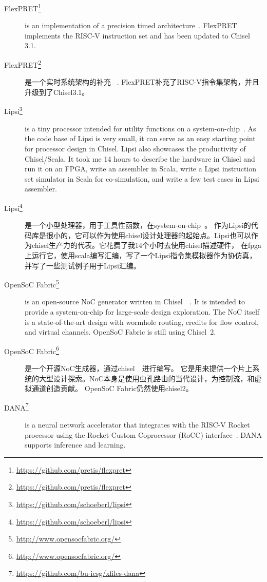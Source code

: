\documentclass[%
    10pt,
    headinclude, footexclude,
    openright, %
    notitlepage,
    cleardoubleempty,
    headsepline,
    pointlessnumbers,
    bibtotoc, idxtotoc,
    ]{scrbook}
\newcommand{\myref}[2]{\href{#1}{#2}}
\renewcommand{\myref}[2]{{#2}{\footnote{\url{#1}}}}
\begin{document}
{{\begin{description}
\item[\myref{https://github.com/pretis/flexpret}{FlexPRET}] is an implementation of a
precision timed architecture~\cite{Zimmer:EECS-2015-181}. FlexPRET implements
the RISC-V instruction set and has been updated to Chisel 3.1.

\item[\myref{https://github.com/pretis/flexpret}{FlexPRET}] 是一个实时系统架构的补充
~\cite{Zimmer:EECS-2015-181}. FlexPRET补充了RISC-V指令集架构，并且升级到了Chisel3.1。

\item[\myref{https://github.com/schoeberl/lipsi}{Lipsi}] is a tiny processor intended
for utility functions on a system-on-chip~\cite{lipsi:arcs2018}. As the code base of
Lipsi is very small, it can serve as an easy starting point for processor design in Chisel.
Lipsi also showcases the productivity of Chisel/Scala. It took me 14 hours to describe the
hardware in Chisel and run it on an FPGA, write an assembler in Scala, write a
Lipsi instruction set simulator in Scala for co-simulation, and write a few test cases
in Lipsi assembler.

\item[\myref{https://github.com/schoeberl/lipsi}{Lipsi}]是一个小型处理器，用于工具性函数，在system-on-chip~\cite{lipsi:arcs2018}。
作为Lipsi的代码库是很小的，它可以作为使用chisel设计处理器的起始点。Lipsi也可以作为chisel生产力的代表。它花费了我14个小时去使用chisel描述硬件，
在fpga上运行它，使用scala编写汇编，写了一个Lipsi指令集模拟器作为协仿真，并写了一些测试例子用于Lipsi汇编。

\item[\myref{http://www.opensocfabric.org/}{OpenSoC Fabric}] is an open-source NoC
generator written in Chisel~~\cite{OpenSoC:ispass2016}. It is intended to provide a
system-on-chip for large-scale design exploration. The NoC itself is a state-of-the-art design with wormhole routing, credits for flow control, and virtual channels.
OpenSoC Fabric is still using Chisel~2.

\item[\myref{http://www.opensocfabric.org/}{OpenSoC Fabric}] 是一个开源NoC生成器，通过chisel~~\cite{OpenSoC:ispass2016}进行编写。
它是用来提供一个片上系统的大型设计探索。NoC本身是使用虫孔路由的当代设计，为控制流，和虚拟通道创造贡献。
OpenSoC Fabric仍然使用chisel2。


\item[\myref{https://github.com/bu-icsg/xfiles-dana}{DANA}] is a neural network accelerator
that integrates with the RISC-V Rocket processor using the Rocket Custom Coprocessor (RoCC) interface~\cite{RoCC:2015}.
DANA supports inference and learning.


\end{description}}}
\end{document}
